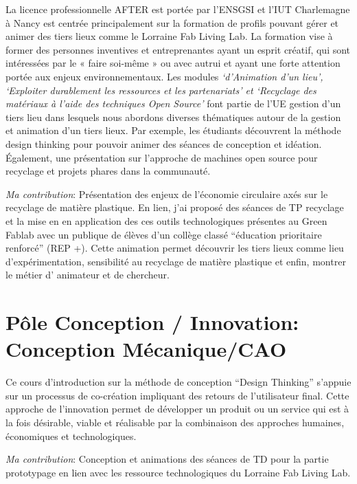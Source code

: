 \documentclass[
  12pt,
  oneside]{book}
\begin{document}
La licence professionnelle AFTER est portée par l'ENSGSI et l'IUT Charlemagne à Nancy est centrée principalement sur la formation de profils pouvant gérer et animer des tiers lieux comme le Lorraine Fab Living Lab. La formation vise à former des personnes inventives et entreprenantes ayant un esprit créatif, qui sont intéressées par le « faire soi-même » ou avec autrui et ayant une forte attention portée aux enjeux environnementaux.
Les modules \emph{`d'Animation d'un lieu', `Exploiter durablement les ressources et les partenariats' et `Recyclage des matériaux à l'aide des techniques Open Source'} font partie de l'UE gestion d'un tiers lieu dans lesquels nous abordons diverses thématiques autour de la gestion et animation d'un tiers lieux. Par exemple, les étudiants découvrent la méthode design thinking pour pouvoir animer des séances de conception et idéation.
Également, une présentation sur l'approche de machines open source pour recyclage et projets phares dans la communauté.

\emph{Ma contribution}: Présentation des enjeux de l'économie circulaire axés sur le recyclage de matière plastique. En lien, j'ai proposé des séances de TP recyclage et la mise en en application des ces outils technologiques présentes au Green Fablab avec un publique de élèves d'un collège classé ``éducation prioritaire renforcé'' (REP +). Cette animation permet découvrir les tiers lieux comme lieu d'expérimentation, sensibilité au recyclage de matière plastique et enfin, montrer le métier d' animateur et de chercheur.

\hypertarget{puxf4le-conception-innovation-conception-muxe9caniquecao}{%
\section{Pôle Conception / Innovation: Conception Mécanique/CAO}\label{puxf4le-conception-innovation-conception-muxe9caniquecao}}

Ce cours d'introduction sur la méthode de conception ``Design Thinking'' s'appuie sur un processus de co-création impliquant des retours de l'utilisateur final.
Cette approche de l'innovation permet de développer un produit ou un service qui est à la fois désirable, viable et réalisable par la combinaison des approches humaines, économiques et technologiques.

\emph{Ma contribution}: Conception et animations des séances de TD pour la partie prototypage en lien avec les ressource technologiques du Lorraine Fab Living Lab.
\end{document}
